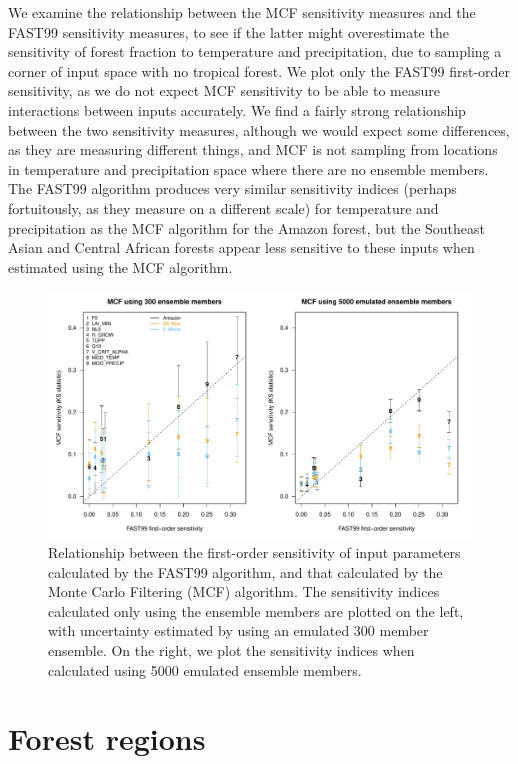 \documentclass[gmd, manuscript]{copernicus} %
\begin{document}
We examine the relationship between the MCF sensitivity measures and the FAST99 sensitivity measures, to see if the latter might overestimate the sensitivity of forest fraction to temperature and precipitation, due to sampling a corner of input space with no tropical forest. We plot only the FAST99 first-order sensitivity, as we do not expect MCF sensitivity to be able to measure interactions between inputs accurately. We find a fairly strong relationship between the two sensitivity measures, although we would expect some differences, as they are measuring different things, and MCF is not sampling from locations in temperature and precipitation space where there are no ensemble members. The FAST99 algorithm produces very similar sensitivity indices (perhaps fortuitously, as they measure on a different scale) for temperature and precipitation as the MCF algorithm for the Amazon forest, but the Southeast Asian and Central African forests appear less sensitive to these inputs when estimated using the MCF algorithm.

\begin{figure}[t]
\includegraphics[width=12cm]{../graphics/fast99_vs_mcf2.pdf}
\caption{Relationship between the first-order sensitivity of input parameters calculated by the FAST99 algorithm, and that calculated by the Monte Carlo Filtering (MCF) algorithm. The sensitivity indices calculated only using the ensemble members are plotted on the left, with uncertainty estimated by using an emulated 300 member ensemble. On the right, we plot the sensitivity indices when calculated using 5000 emulated ensemble members.}
\label{fig:fast99_vs_mcf2}
\end{figure}

\section{Forest regions}
\end{document}
